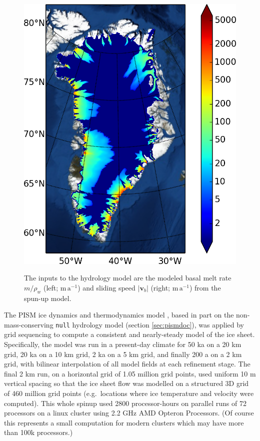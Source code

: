 \documentclass[gmd]{copernicus}   %
\newcommand\bv{\mathbf{v}}
\begin{document}
\begin{figure}[ht]
{\includegraphics[height=\grnht,keepaspectratio=true]{g2km-init-velbase-mag}}
\caption{The inputs to the hydrology model are the modeled basal melt rate $m/\rho_w$ (left; $\mathrm{m}\,\mathrm{a}^{-1}$) and sliding speed $|\bv_b|$ (right; $\mathrm{m}\,\mathrm{a}^{-1}$) from the spun-up model.}
\label{fig:Greenhydroinputs}
\end{figure}

The PISM ice dynamics and thermodynamics model \citep{AschwandenBuelerKhroulevBlatter,BBssasliding,Winkelmannetal2011}, based in part on the non-mass-conserving \texttt{null} hydrology model (section \ref{sec:pismdoc}), was applied by grid sequencing to compute a consistent and nearly-steady model of the ice sheet.  Specifically, the model was run in a present-day climate for 50 ka on a 20 km grid, 20 ka on a 10 km grid, 2 ka on a 5 km grid, and finally 200 a on a 2 km grid, with bilinear interpolation of all model fields at each refinement stage.  The final 2 km run, on a horizontal grid of 1.05 million grid points, used uniform 10 m vertical spacing so that the ice sheet flow was modelled on a structured 3D grid of 460 million grid points (e.g.~locations where ice temperature and velocity were computed).  This whole spinup used 2800 processor-hours on parallel runs of 72 processors on a linux cluster using 2.2 GHz AMD Opteron Processors.  (Of course this represents a small computation for modern clusters which may have more than 100k processors.)
\end{document}
